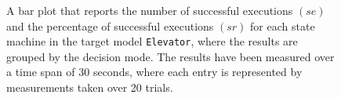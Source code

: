\begin{figure}[h!]
\centering
\begin{minipage}{1\textwidth}
  \centering
  \makebox[\textwidth][c]{ %
        \resizebox{1.19\textwidth}{!}{ %
            
        }%
    }%
\end{minipage}
\caption{A bar plot that reports the number of successful executions $(se)$ and the percentage of successful executions $(sr)$ for each state machine in the target model \texttt{Elevator}, where the results are grouped by the decision mode. The results have been measured over a time span of 30 seconds, where each entry is represented by measurements taken over 20 trials.}
\label{figure:decision_mode_state_machine_transition_frequency_comparison_elevator}
\end{figure}